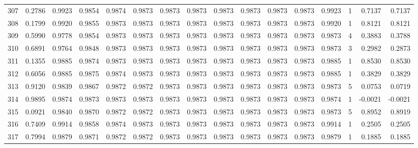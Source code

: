 \begin{tabular}{lrrrrrrrrrrrrrrr}
307 &      0.2786 &  0.9923 &  0.9854 &  0.9874 &  0.9873 &  0.9873 &  0.9873 &  0.9873 &  0.9873 &  0.9873 &   0.9873 &     0.9923 &      1 &                    0.7137 &                     0.7137 \\
308 &      0.1799 &  0.9920 &  0.9855 &  0.9873 &  0.9873 &  0.9873 &  0.9873 &  0.9873 &  0.9873 &  0.9873 &   0.9873 &     0.9920 &      1 &                    0.8121 &                     0.8121 \\
309 &      0.5990 &  0.9778 &  0.9854 &  0.9873 &  0.9873 &  0.9873 &  0.9873 &  0.9873 &  0.9873 &  0.9873 &   0.9873 &     0.9873 &      4 &                    0.3883 &                     0.3788 \\
310 &      0.6891 &  0.9764 &  0.9848 &  0.9873 &  0.9873 &  0.9873 &  0.9873 &  0.9873 &  0.9873 &  0.9873 &   0.9873 &     0.9873 &      3 &                    0.2982 &                     0.2873 \\
311 &      0.1355 &  0.9885 &  0.9874 &  0.9873 &  0.9873 &  0.9873 &  0.9873 &  0.9873 &  0.9873 &  0.9873 &   0.9873 &     0.9885 &      1 &                    0.8530 &                     0.8530 \\
312 &      0.6056 &  0.9885 &  0.9875 &  0.9874 &  0.9873 &  0.9873 &  0.9873 &  0.9873 &  0.9873 &  0.9873 &   0.9873 &     0.9885 &      1 &                    0.3829 &                     0.3829 \\
313 &      0.9120 &  0.9839 &  0.9867 &  0.9872 &  0.9872 &  0.9873 &  0.9873 &  0.9873 &  0.9873 &  0.9873 &   0.9873 &     0.9873 &      5 &                    0.0753 &                     0.0719 \\
314 &      0.9895 &  0.9874 &  0.9873 &  0.9873 &  0.9873 &  0.9873 &  0.9873 &  0.9873 &  0.9873 &  0.9873 &   0.9873 &     0.9874 &      1 &                   -0.0021 &                    -0.0021 \\
315 &      0.0921 &  0.9840 &  0.9870 &  0.9872 &  0.9872 &  0.9873 &  0.9873 &  0.9873 &  0.9873 &  0.9873 &   0.9873 &     0.9873 &      5 &                    0.8952 &                     0.8919 \\
316 &      0.7409 &  0.9914 &  0.9858 &  0.9874 &  0.9873 &  0.9873 &  0.9873 &  0.9873 &  0.9873 &  0.9873 &   0.9873 &     0.9914 &      1 &                    0.2505 &                     0.2505 \\
317 &      0.7994 &  0.9879 &  0.9871 &  0.9872 &  0.9872 &  0.9873 &  0.9873 &  0.9873 &  0.9873 &  0.9873 &   0.9873 &     0.9879 &      1 &                    0.1885 &                     0.1885 \\

\end{tabular}

